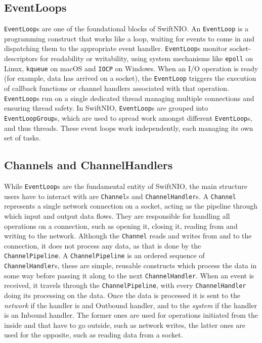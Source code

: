 \subsection{EventLoops}
\lstinline{EventLoop}s are one of the foundational blocks of SwiftNIO. An \lstinline{EventLoop} is a programming construct that works like a  loop, waiting for events to come in and dispatching them to the appropriate event handler. \cite{kuepper-microservices} \lstinline{EventLoop}s monitor \gls{socket-descriptor}s for readability or writability, using system mechanisms like \lstinline{epoll} on Linux, \lstinline{kqueue} on macOS  and \lstinline{IOCP} on Windows. When an I/O operation is ready (for example, data has arrived on a socket), the \lstinline{EventLoop} triggers the execution of callback functions or channel handlers associated with that operation. \lstinline{EventLoop}s run on a single dedicated thread managing multiple connections and ensuring thread safety. In SwiftNIO, \lstinline{EventLoop}s are grouped into \lstinline{EventLoopGroup}s, which are used to spread work amongst different \lstinline{EventLoop}s, and thus threads. These event loops work independently, each managing its own set of tasks. \cite{swiftnio-docs}

\subsection{Channels and ChannelHandlers}
While \lstinline{EventLoop}s are the fundamental entity of SwiftNIO, the main structure users have to interact with are \lstinline{Channel}s and \lstinline{ChannelHandler}s. A \lstinline{Channel} represents a single network connection on a socket, acting as the pipeline through which input and output data flows. They are responsible for handling all operations on a connection, such as opening it, closing it, reading from and writing to the network. Although the \lstinline{Channel} reads and writes from and to the connection, it does not process any data, as that is done by the \lstinline{ChannelPipeline}. A \lstinline{ChannelPipeline} is an ordered sequence of \lstinline{ChannelHandler}s, these are simple, reusable constructs which process the data in some way before passing it along to the next \lstinline{ChannelHandler}. When an event is received, it travels through the \lstinline{ChannelPipeline}, with every \lstinline{ChannelHandler} doing its processing on the data. Once the data is processed it is sent to the \textit{network} if the handler is and Outbound handler, and to the \textit{system} if the handler is an Inbound handler. The former ones are used for operations initiated from the inside and that have to go outside, such as network writes, the latter ones are used for the opposite, such as reading data from a socket. \cite{swiftnio-docs}

